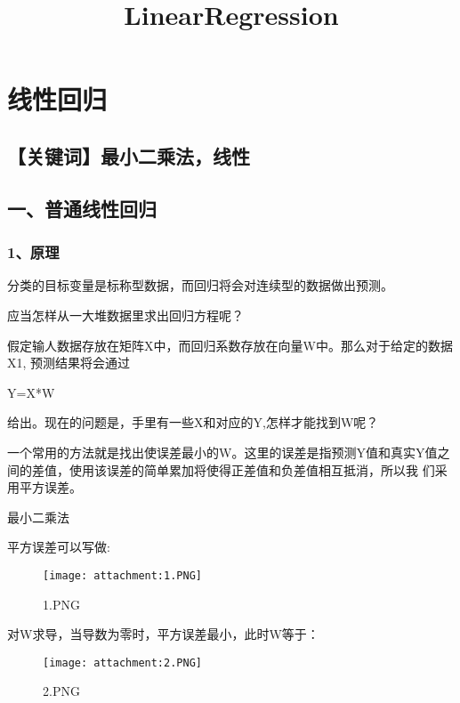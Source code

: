 \documentclass[11pt]{article}
\title{LinearRegression }
\makeatletter
\def\maxwidth{\ifdim\Gin@nat@width>\linewidth\linewidth
    \else\Gin@nat@width\fi}
\let\Oldincludegraphics\includegraphics
\renewcommand{\includegraphics}[1]{\Oldincludegraphics[width=.8\maxwidth]{#1}}
\makeatother
\begin{document}
    
    
    \maketitle
    
    

    
    \section{线性回归}\label{ux7ebfux6027ux56deux5f52}

    \subsection{【关键词】最小二乘法，线性}\label{ux5173ux952eux8bcdux6700ux5c0fux4e8cux4e58ux6cd5ux7ebfux6027}

    \subsection{一、普通线性回归}\label{ux4e00ux666eux901aux7ebfux6027ux56deux5f52}

    \subsubsection{1、原理}\label{ux539fux7406}

    分类的目标变量是标称型数据，而回归将会对连续型的数据做出预测。

    应当怎样从一大堆数据里求出回归方程呢？

假定输人数据存放在矩阵X中，而回归系数存放在向量W中。那么对于给定的数据X1,
预测结果将会通过

Y=X*W

给出。现在的问题是，手里有一些X和对应的Y,怎样才能找到W呢？

一个常用的方法就是找出使误差最小的W。这里的误差是指预测Y值和真实Y值之间的差值，使用该误差的简单累加将使得正差值和负差值相互抵消，所以我
们采用平方误差。

    最小二乘法

    平方误差可以写做:

\begin{figure}
\centering
\texttt{[image: attachment:1.PNG]}
\caption{1.PNG}
\end{figure}

对W求导，当导数为零时，平方误差最小，此时W等于：

\begin{figure}
\centering
\texttt{[image: attachment:2.PNG]}
\caption{2.PNG}
\end{figure}
\end{document}
